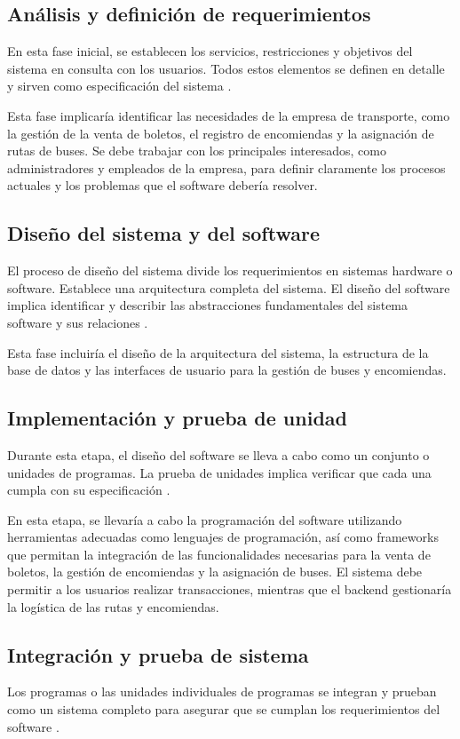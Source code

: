 		
	\subsection{Análisis y definición de requerimientos}
		En esta fase inicial, se establecen los servicios, restricciones y objetivos del sistema en consulta con los usuarios. Todos estos elementos se definen en detalle y sirven como especificación del sistema \parencite{sommerville2011introduccion}.
		
		Esta fase implicaría identificar las necesidades de la empresa de transporte, como la gestión de la venta de boletos, el registro de encomiendas y la asignación de rutas de buses. Se debe trabajar con los principales interesados, como administradores y empleados de la empresa, para definir claramente los procesos actuales y los problemas que el software debería resolver.
	\subsection{Diseño del sistema y del software}
		El proceso de diseño del sistema divide los requerimientos en sistemas hardware o software. Establece una arquitectura completa del sistema. El diseño del software implica identificar y describir las abstracciones fundamentales del sistema software y sus relaciones \parencite{sommerville2011introduccion}.
		
		Esta fase incluiría el diseño de la arquitectura del sistema, la estructura de la base de datos y las interfaces de usuario para la gestión de buses y encomiendas.
	\subsection{Implementación y prueba de unidad}
		Durante esta etapa, el diseño del software se lleva a cabo como un conjunto o unidades de programas. La prueba de unidades implica verificar que cada una cumpla con su especificación \parencite{sommerville2011introduccion}.
		
		En esta etapa, se llevaría a cabo la programación del software utilizando herramientas adecuadas como lenguajes de programación, así como frameworks que permitan la integración de las funcionalidades necesarias para la venta de boletos, la gestión de encomiendas y la asignación de buses. El sistema debe permitir a los usuarios realizar transacciones, mientras que el backend gestionaría la logística de las rutas y encomiendas.
	\subsection{Integración y prueba de sistema}
		Los programas o las unidades individuales de programas se integran y prueban como un sistema completo para asegurar que se cumplan los requerimientos del software \parencite{sommerville2011introduccion}.
		
